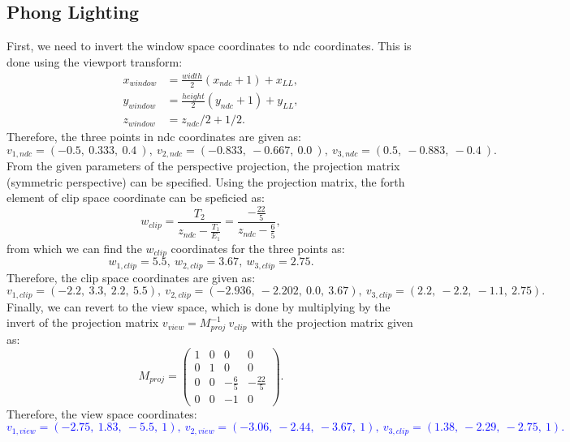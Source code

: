 \documentclass[11pt]{article}
\begin{document}
\subsection{Phong Lighting}
First, we need to invert the window space coordinates to ndc coordinates. This is done using the viewport transform:
\begin{align*}
    x_{window} &= \frac{width}{2}(x_{ndc}+1)+x_{LL},\\
    y_{window} &= \frac{height}{2}(y_{ndc}+1)+y_{LL},\\
    z_{window} &= z_{ndc}/2 + 1/2.
\end{align*}
Therefore, the three points in ndc coordinates are given as: \[v_{1,ndc} = (-0.5,\ 0.333,\ 0.4\ ),\ v_{2,ndc} = (-0.833,\ -0.667,\ 0.0\ ),\ v_{3,ndc} = (0.5,\ -0.883,\ -0.4\ ).\]
From the given parameters of the perspective projection, the projection matrix (symmetric perspective) can be specified. Using the projection matrix, the forth element of clip space coordinate can be speficied as:
\begin{equation}
    w_{clip} = \frac{T_2}{z_{ndc}-\frac{T_1}{E_1}} = \frac{-\frac{22}{5}}{z_{ndc} - \frac{6}{5}},
\end{equation}
from which we can find the $w_{clip}$ coordinates for the three points as: \[w_{1,clip}= 5.5,\ w_{2,clip}= 3.67,\ w_{3,clip}= 2.75.\]
Therefore, the clip space coordinates are given as:
\[v_{1,clip} = (-2.2,\ 3.3,\ 2.2,\ 5.5),\ v_{2,clip} = (-2.936,\ -2.202,\ 0.0,\ 3.67),\ v_{3,clip} = (2.2,\ -2.2,\ -1.1,\ 2.75).\]
Finally, we can revert to the view space, which is done by multiplying by the invert of the projection matrix $v_{view} = M_{proj}^{-1}\ v_{clip}$ with the projection matrix given as:
\begin{equation*}
    M_{proj} = \begin{pmatrix}
        1 & 0 & 0 & 0\\[2pt]
        0 & 1 & 0 & 0\\[2pt]
        0 & 0 & -\frac{6}{5} & -\frac{22}{5}\\[2pt]
        0 & 0 & -1 & 0
    \end{pmatrix}.
\end{equation*}
Therefore, the view space coordinates:
\textcolor{blue}{\[v_{1,view} = (-2.75,\ 1.83,\ -5.5,\ 1),\ v_{2,view} = (-3.06,\ -2.44,\ -3.67,\ 1),\ v_{3,clip} = (1.38,\ -2.29,\ -2.75,\ 1).\]}
\end{document}
